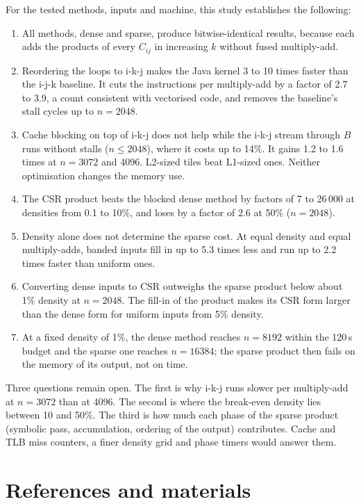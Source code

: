 \documentclass[11pt,a4paper]{article}
\begin{document}
For the tested methods, inputs and machine, this study establishes the
following:
\begin{enumerate}
  \item All methods, dense and sparse, produce bitwise-identical results,
  because each adds the products of every $C_{ij}$ in increasing $k$ without
  fused multiply-add.
  \item Reordering the loops to i-k-j makes the Java kernel 3 to 10 times faster
  than the i-j-k baseline. It cuts the instructions per multiply-add by a factor
  of 2.7 to 3.9, a count consistent with vectorised code, and removes the baseline's
  stall cycles up to $n=2048$.
  \item Cache blocking on top of i-k-j does not help while the i-k-j stream
  through $B$ runs without stalls ($n\le2048$), where it costs up to 14\%. It
  gains 1.2 to 1.6 times at $n=3072$ and 4096. L2-sized tiles beat L1-sized
  ones. Neither optimisation changes the memory use.
  \item The CSR product beats the blocked dense method by factors of 7 to
  26\,000 at densities from 0.1 to 10\%, and loses by a factor of 2.6 at 50\%
  ($n=2048$).
  \item Density alone does not determine the sparse cost. At equal density and
  equal multiply-adds, banded inputs fill in up to 5.3 times less and run up to
  2.2 times faster than uniform ones.
  \item Converting dense inputs to CSR outweighs the sparse product below about
  1\% density at $n=2048$. The fill-in of the product makes its CSR form larger
  than the dense form for uniform inputs from 5\% density.
  \item At a fixed density of 1\%, the dense method reaches $n=8192$ within the
  120\,s budget and the sparse one reaches $n=16384$; the sparse product then
  fails on the memory of its output, not on time.
\end{enumerate}
Three questions remain open. The first is why i-k-j runs slower per
multiply-add at $n=3072$ than at 4096. The second is where the break-even
density lies between 10 and 50\%. The third is how much each phase of the
sparse product (symbolic pass, accumulation, ordering of the output) contributes.
Cache and TLB miss counters, a finer density grid and phase timers would answer
them.

\section{References and materials}
\label{sec:materials}
\end{document}
